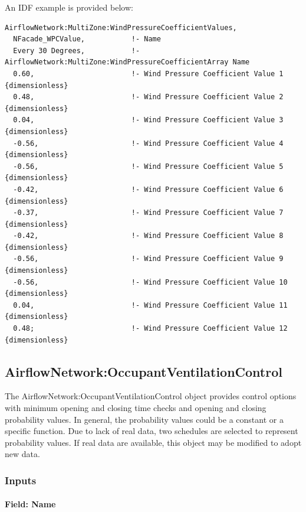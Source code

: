An IDF example is provided below:

\begin{lstlisting}
AirflowNetwork:MultiZone:WindPressureCoefficientValues,
  NFacade_WPCValue,           !- Name
  Every 30 Degrees,           !- AirflowNetwork:MultiZone:WindPressureCoefficientArray Name
  0.60,                       !- Wind Pressure Coefficient Value 1 {dimensionless}
  0.48,                       !- Wind Pressure Coefficient Value 2 {dimensionless}
  0.04,                       !- Wind Pressure Coefficient Value 3 {dimensionless}
  -0.56,                      !- Wind Pressure Coefficient Value 4 {dimensionless}
  -0.56,                      !- Wind Pressure Coefficient Value 5 {dimensionless}
  -0.42,                      !- Wind Pressure Coefficient Value 6 {dimensionless}
  -0.37,                      !- Wind Pressure Coefficient Value 7 {dimensionless}
  -0.42,                      !- Wind Pressure Coefficient Value 8 {dimensionless}
  -0.56,                      !- Wind Pressure Coefficient Value 9 {dimensionless}
  -0.56,                      !- Wind Pressure Coefficient Value 10 {dimensionless}
  0.04,                       !- Wind Pressure Coefficient Value 11 {dimensionless}
  0.48;                       !- Wind Pressure Coefficient Value 12 {dimensionless}
\end{lstlisting}

\subsection{AirflowNetwork:OccupantVentilationControl}\label{airflownetworkoccupantventilationcontrol}

The AirflowNetwork:OccupantVentilationControl object provides control options with minimum opening and closing time checks and opening and closing probability values. In general, the probability values could be a constant or a specific function. Due to lack of real data, two schedules are selected to represent probability values. If real data are available, this object may be modified to adopt new data.

\subsubsection{Inputs}\label{inputs-11-001}

\paragraph{Field: Name}\label{field-name-11-001}

